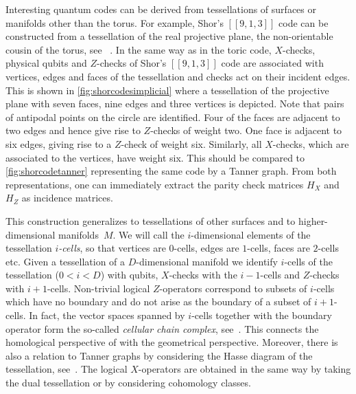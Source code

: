 \documentclass[amsmath, amssymb, floatfix, reprint, twocolumn, notitlepage, 10pt]{revtex4-1}
\newcommand{\change}{}
\begin{document}
{\change Interesting quantum codes can be derived from tessellations of surfaces or manifolds other than the torus. For example, Shor's $[[9,1,3]]$ code can be constructed from a tessellation of the real projective plane, the non-orientable cousin of the torus, see ~\cite{freedman2001projective}. In the same way as in the toric code, $X$-checks, physical qubits and $Z$-checks of Shor's $[[9,1,3]]$ code are associated with vertices, edges and faces of the tessellation and checks act on their incident edges.
This is shown in \cref{fig:shorcodesimplicial} where a tessellation of the projective plane with seven faces, nine edges and three vertices is depicted.
Note that pairs of antipodal points on the circle are identified.
Four of the faces are adjacent to two edges and hence give rise to $Z$-checks of weight two. One face is adjacent to six edges, giving rise to a $Z$-check of weight six.
Similarly, all $X$-checks, which are associated to the vertices, have weight six.
This should be compared to \cref{fig:shorcodetanner} representing the same code by a Tanner graph. From both representations, one can immediately extract the parity check matrices $H_X$ and $H_Z$ as incidence matrices.
}

This construction generalizes to tessellations of other surfaces and to higher-dimensional manifolds~$M$.
We will call the $i$-dimensional elements of the tessellation \emph{$i$-cells}, so that vertices are $0$-cells, edges are $1$-cells, faces are $2$-cells etc.
Given a tessellation of a $D$-dimensional manifold we identify $i$-cells of the tessellation ($0< i < D$) with qubits, $X$-checks with the $i-1$-cells and $Z$-checks with $i+1$-cells.
{\change Non-trivial logical $Z$-operators correspond to subsets of $i$-cells which have no boundary and do not arise as the boundary of a subset of $i+1$-cells.
In fact, the vector spaces spanned by $i$-cells together with the boundary operator form the so-called \emph{cellular chain complex}, see~\cite[Section 2.2.]{hatcher2002algebraic}.
This connects the homological perspective of  with the geometrical perspective. Moreover, there is also a relation to Tanner graphs by considering the Hasse diagram of the tessellation, see~\cite[Section 2.2.]{breuckmann2017homological}.
The logical $X$-operators are obtained in the same way by taking the dual tessellation or by considering cohomology classes.}
%
\end{document}
